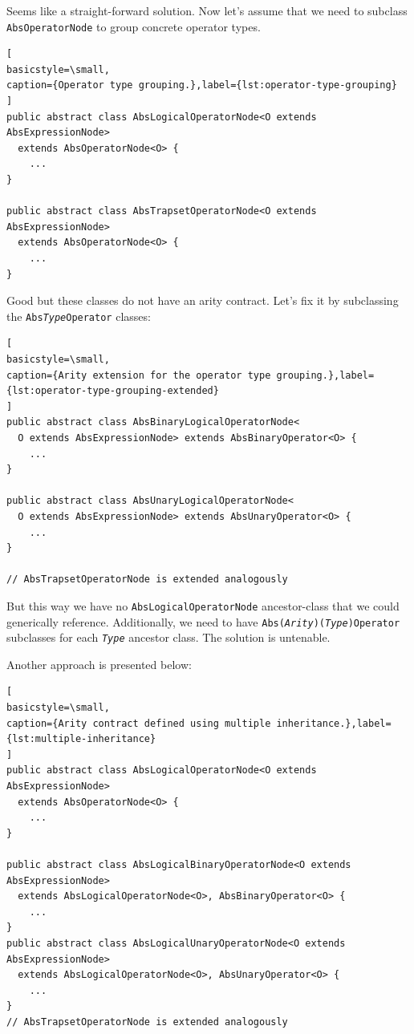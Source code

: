 \documentclass[12pt,oneside,a4paper,notitlepage]{report}
\begin{document}
	\bigskip

	\par Seems like a straight-forward solution. Now let's assume that we need to subclass \texttt{AbsOperatorNode} to group concrete operator types.

	\begin{lstlisting}[
basicstyle=\small,
caption={Operator type grouping.},label={lst:operator-type-grouping}
]
public abstract class AbsLogicalOperatorNode<O extends AbsExpressionNode>
  extends AbsOperatorNode<O> {
	...
}

public abstract class AbsTrapsetOperatorNode<O extends AbsExpressionNode>
  extends AbsOperatorNode<O> {
	...
}
	\end{lstlisting}

	\bigskip

	\par Good but these classes do not have an arity contract. Let's fix it by subclassing the \texttt{Abs\textit{Type}Operator} classes:
	\begin{lstlisting}[
basicstyle=\small,
caption={Arity extension for the operator type grouping.},label={lst:operator-type-grouping-extended}
]
public abstract class AbsBinaryLogicalOperatorNode<
  O extends AbsExpressionNode> extends AbsBinaryOperator<O> {
	...
}

public abstract class AbsUnaryLogicalOperatorNode<
  O extends AbsExpressionNode> extends AbsUnaryOperator<O> {
	...
}

// AbsTrapsetOperatorNode is extended analogously
	\end{lstlisting}

	\bigskip

	\par But this way we have no \texttt{AbsLogicalOperatorNode} ancestor-class that we could generically reference. 
	Additionally, we need to have \texttt{Abs(\textit{Arity})(\textit{Type})Operator} subclasses for each \texttt{\textit{Type}} ancestor class. The solution is untenable.

	\bigskip

	\par Another approach is presented below:
	\begin{lstlisting}[
basicstyle=\small,
caption={Arity contract defined using multiple inheritance.},label={lst:multiple-inheritance}
]
public abstract class AbsLogicalOperatorNode<O extends AbsExpressionNode>
  extends AbsOperatorNode<O> {
	...
}

public abstract class AbsLogicalBinaryOperatorNode<O extends AbsExpressionNode>
  extends AbsLogicalOperatorNode<O>, AbsBinaryOperator<O> {
	...
}
public abstract class AbsLogicalUnaryOperatorNode<O extends AbsExpressionNode>
  extends AbsLogicalOperatorNode<O>, AbsUnaryOperator<O> {
	...
}
// AbsTrapsetOperatorNode is extended analogously
	\end{lstlisting}
	\bigskip 
\end{document}
